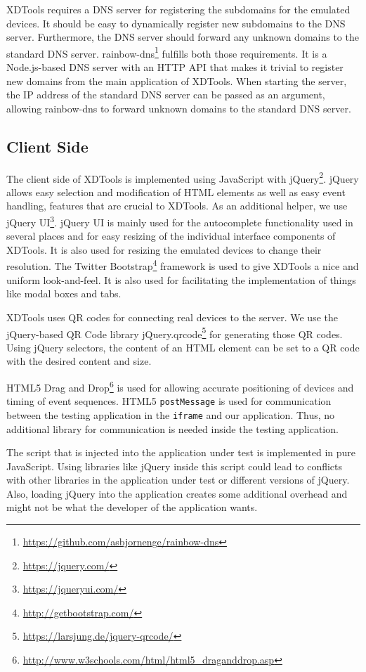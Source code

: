 XDTools requires a DNS server for registering the subdomains for the emulated devices. It should be easy to dynamically register new subdomains to the DNS server. Furthermore, the DNS server should forward any unknown domains to the standard DNS server. rainbow-dns\footnote{\url{https://github.com/asbjornenge/rainbow-dns}} fulfills both those requirements. It is a Node.js-based DNS server with an HTTP API that makes it trivial to register new domains from the main application of XDTools. When starting the server, the IP address of the standard DNS server can be passed as an argument, allowing rainbow-dns to forward unknown domains to the standard DNS server.

\subsection{Client Side}

The client side of XDTools is implemented using JavaScript with jQuery\footnote{\url{https://jquery.com/}}. jQuery allows easy selection and modification of HTML elements as well as easy event handling, features that are crucial to XDTools. As an additional helper, we use jQuery UI\footnote{\url{https://jqueryui.com/}}. jQuery UI is mainly used for the autocomplete functionality used in several places and for easy resizing of the individual interface components of XDTools. It is also used for resizing the emulated devices to change their resolution. The Twitter Bootstrap\footnote{\url{http://getbootstrap.com/}} framework is used to give XDTools a nice and uniform look-and-feel. It is also used for facilitating the implementation of things like modal boxes and tabs. 

XDTools uses QR codes for connecting real devices to the server. We use the jQuery-based QR Code library jQuery.qrcode\footnote{\url{https://larsjung.de/jquery-qrcode/}} for generating those QR codes. Using jQuery selectors, the content of an HTML element can be set to a QR code with the desired content and size.

HTML5 Drag and Drop\footnote{\url{http://www.w3schools.com/html/html5_draganddrop.asp}} is used for allowing accurate positioning of devices and timing of event sequences. HTML5 \lstinline|postMessage| is used for communication between the testing application in the \lstinline|iframe| and our application. Thus, no additional library for communication is needed inside the testing application.

The script that is injected into the application under test is implemented in pure JavaScript. Using libraries like jQuery inside this script could lead to conflicts with other libraries in the application under test or different versions of jQuery. Also, loading jQuery into the application creates some additional overhead and might not be what the developer of the application wants.

